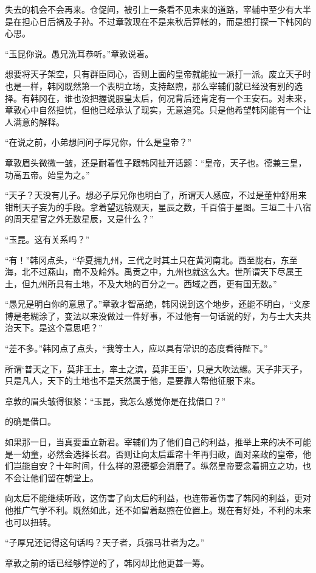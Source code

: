 失去的机会不会再来。仓促间，被引上一条看不见未来的道路，宰辅中至少有大半是在担心日后祸及子孙。不过章敦现在不是来秋后算帐的，而是想打探一下韩冈的心思。

“玉昆你说。愚兄洗耳恭听。”章敦说着。

想要将天子架空，只有群臣同心，否则上面的皇帝就能拉一派打一派。废立天子时也是一样，韩冈既然第一个表明立场，支持赵煦，那么宰辅们就已经没有别的选择。有韩冈在，谁也没把握说服皇太后，何况背后还肯定有一个王安石。对未来，章敦心中自然担忧，但他已经承认了现实，无意追究。只是他希望韩冈能有一个让人满意的解释。

“在说之前，小弟想问问子厚兄你，什么是皇帝？”

章敦眉头微微一皱，还是耐着性子跟韩冈扯开话题：“皇帝，天子也。德兼三皇，功高五帝。始皇为之。”

“天子？天没有儿子。想必子厚兄你也明白了，所谓天人感应，不过是董仲舒用来钳制天子妄为的手段。拿着望远镜观天，星辰之数，千百倍于星图。三垣二十八宿的周天星官之外无数星辰，又是什么？”

“玉昆。这有关系吗？”

“有！”韩冈点头，“华夏拥九州，三代之时其土只在黄河南北。西至陇右，东至海，北不过燕山，南不及岭外。禹贡之中，九州也就这么大。世所谓天下尽属王土，但九州所具有土地，不及大地的百分之一。西域之西，更有国无数。”

“愚兄是明白你的意思了。”章敦才智高绝，韩冈说到这个地步，还能不明白，“文彦博是老糊涂了，变法以来没做过一件好事，不过他有一句话说的好，为与士大夫共治天下。是这个意思吧？”

“差不多。”韩冈点了点头，“我等士人，应以具有常识的态度看待陛下。”

所谓‘普天之下，莫非王土，率土之滨，莫非王臣’，只是大吹法螺。天子非天子，只是凡人，天下的土地也不是天然属于他，是要靠人帮他征服下来。

章敦的眉头皱得很紧：“玉昆，我怎么感觉你是在找借口？”

的确是借口。

如果那一日，当真要重立新君。宰辅们为了他们自己的利益，推举上来的决不可能是一幼童，必然会选择长君。否则让向太后垂帘十年再归政，面对亲政的皇帝，他们岂能自安？十年时间，什么样的恩德都会消磨了。纵然皇帝要念着拥立之功，也不会让他们留在朝堂上。

向太后不能继续听政，这伤害了向太后的利益，也连带着伤害了韩冈的利益，更对他推广气学不利。既然如此，还不如留着赵煦在位置上。现在有好处，不利的未来也可以扭转。

“子厚兄还记得这句话吗？天子者，兵强马壮者为之。”

章敦之前的话已经够悖逆的了，韩冈却比他更甚一筹。

